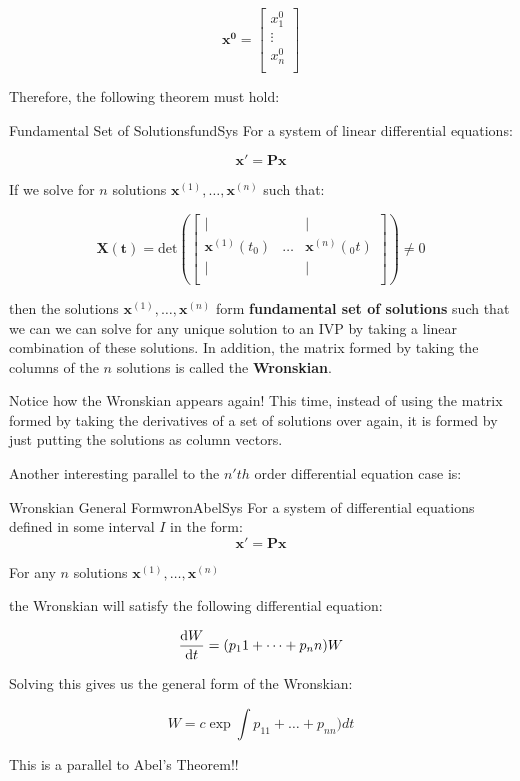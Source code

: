 \documentclass{report}
\begin{document}
$$
\mathbf{x^0} =
\begin{bmatrix}
    x_1^0 \\
    \vdots \\
    x_n^0 \\
\end{bmatrix}
$$

Therefore, the following theorem must hold:


\begin{mytheo}{Fundamental Set of Solutions}{fundSys}
For a system of linear differential equations:

$$\mathbf{x'} = \mathbf{Px}$$

If we solve for $n$ solutions 
$\mathbf{x}^{(1)}, \dots, \mathbf{x}^{(n)}$ such that:

$$\mathbf{X(t)} = 
\text{det}\left(\begin{bmatrix}
    \vert & & \vert \\
    \mathbf{x}^{(1)}(t_0) & \dots & \mathbf{x}^{(n)}(_0t) \\
    \vert & & \vert \\
\end{bmatrix}\right)
\neq 0
$$

then the solutions $\mathbf{x}^{(1)}, \dots, \mathbf{x}^{(n)}$ form \textbf{fundamental set of solutions} such that we can we can solve for any unique solution to an IVP by taking a linear combination of these solutions. In addition, the matrix formed by taking the columns of the $n$ solutions is called the \textbf{Wronskian}.

\end{mytheo}

Notice how the Wronskian appears again! This time, instead of using the matrix formed by taking the derivatives of a set of solutions over again, it is formed by just putting the solutions as column vectors.

Another interesting parallel to the $n'th$ order differential equation case is:

\begin{mytheo}{Wronskian General Form}{wronAbelSys}
    For a system of differential equations defined in some interval $I$ in the form:
    $$\mathbf{x'} = \mathbf{Px}$$
    
    For any $n$ solutions $\mathbf{x}^{(1)}, \dots, \mathbf{x}^{(n)}$
    
    the Wronskian will satisfy the following differential equation:
    
    $$\dv{W}{t} = (p_11 + \dots + p_nn)W$$
    
    Solving this gives us the general form of the Wronskian:
    
    $$W = c\exp{\int{p_{11} + \dots + p_{nn})dt}}$$
\end{mytheo}
This is a parallel to Abel's Theorem!!
\end{document}
